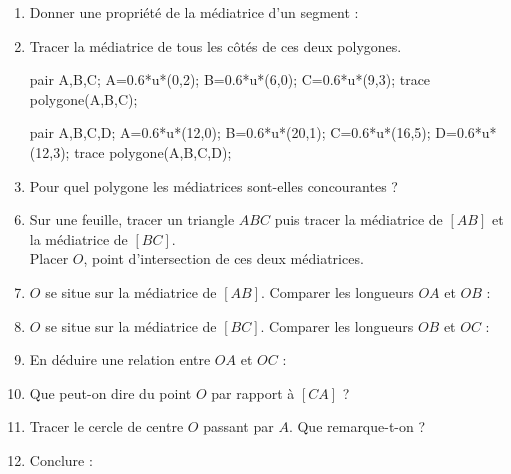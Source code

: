 \begin{activite}
\begin{changemargin}{-10mm}{-15mm}
\begin{enumerate}
                  \pointilles \smallskip
            \item Donner une propriété de la médiatrice d'un segment : \par \medskip
                  \pointilles \smallskip
            \item Tracer la médiatrice de tous les côtés de ces deux polygones.
                  \begin{center}
                          \begin{Geometrie}
                            pair A,B,C;
                            A=0.6*u*(0,2);
                            B=0.6*u*(6,0);
                            C=0.6*u*(9,3);
                            trace polygone(A,B,C);
                          \end{Geometrie}
                          \hspace*{25mm}
                          \begin{Geometrie}[CoinHD={(20u,5u)}]
                            pair A,B,C,D;
                            A=0.6*u*(12,0);
                            B=0.6*u*(20,1);
                            C=0.6*u*(16,5);
                            D=0.6*u*(12,3);
                            trace polygone(A,B,C,D);
                          \end{Geometrie}
                  \end{center}
            \item Pour quel polygone les médiatrices sont-elles concourantes ? \pointilles \\
        \end{enumerate}

        \partie[démonstration] %
        \vspace*{-7mm}
        \begin{enumerate}
            \setcounter{enumi}{5}
            \item Sur une feuille, tracer un triangle $ABC$ puis tracer la médiatrice de $[AB]$ et la médiatrice de $[BC]$. \\
                  Placer $O$, point d'intersection de ces deux médiatrices.
            \item $O$ se situe sur la médiatrice de $[AB]$. Comparer les longueurs $OA$ et $OB$ : \pointilles \medskip
            \item $O$ se situe sur la médiatrice de $[BC]$. Comparer les longueurs $OB$ et $OC$ : \pointilles \medskip
            \item En déduire une relation entre $OA$ et $OC$ : \pointilles \medskip
            \item Que peut-on dire du point $O$ par rapport à $[CA]$ ? \pointilles \medskip
            \item Tracer le cercle de centre $O$ passant par $A$. Que remarque-t-on ? \pointilles \medskip
            \item Conclure : \pointilles 
        \end{enumerate}
    \end{changemargin}
\end{activite}